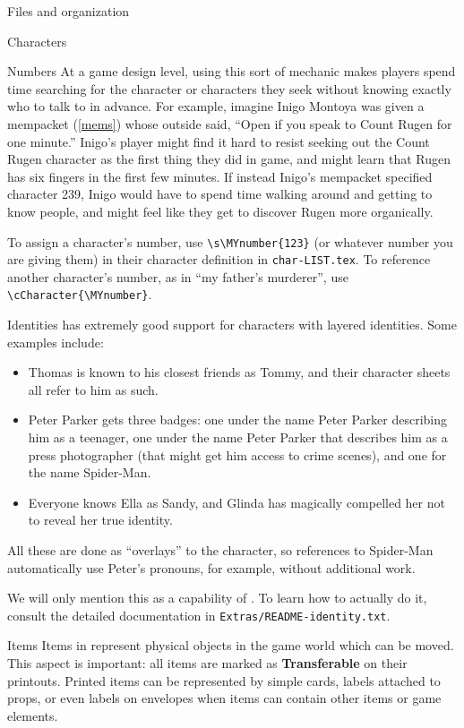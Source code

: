 \documentclass[sheet]{GameTexBase}
\begin{document}
\begin{section}{Files and organization}
\begin{subsection}{Characters}
\begin{subsubsection}{Numbers}
At a game design level, using this sort of mechanic makes players spend time searching for the character or characters they seek without knowing exactly who to talk to in advance.  For example, imagine Inigo Montoya was given a
mempacket (\ref{mems}) whose outside said, ``Open if you speak to Count Rugen for one minute.''  Inigo's player might find it hard to resist seeking out the Count Rugen character as the first thing they did in game, and might learn that Rugen has six fingers in the first few minutes.  If instead Inigo's mempacket specified character 239, Inigo would have to spend time walking around and getting to know people, and might feel like they get to discover Rugen more organically.

To assign a character's number, use \lstinline|\s\MYnumber{123}| (or whatever number you are giving them) in their character definition in \lstinline|char-LIST.tex|.
To reference another character's number, as in ``my father's murderer'', use \lstinline|\cCharacter{\MYnumber}|.
\end{subsubsection}
\begin{subsubsection}{Identities}
\label{identities}
\gametex{} has extremely good support for characters with layered identities.  Some examples include:
\begin{itemize}
\item Thomas is known to his closest friends as Tommy, and their character sheets all refer to him as such.
\item Peter Parker gets three badges: one under the name Peter Parker describing him as a teenager, one under the name Peter Parker that describes him as a press photographer (that might get him access to crime scenes), and one for the name Spider-Man.
\item Everyone knows Ella as Sandy, and Glinda has magically compelled her not to reveal her true identity.
\end{itemize}
All these are done as ``overlays'' to the character, so references to Spider-Man automatically use Peter's pronouns, for example, without additional work.

We will only mention this as a capability of \gametex{}.  To learn how to actually do it, consult the detailed documentation in \lstinline|Extras/README-identity.txt|.
\end{subsubsection}
\end{subsection}
\begin{subsection}{Items}
Items in \gametex{} represent physical objects in the game world which can be moved.  This aspect is important: all items are marked as \textbf{Transferable} on their printouts.
Printed \gametex{} items can be represented by simple cards, labels attached to props, or even labels on envelopes when items can contain other items or game elements.


\end{subsection}
\end{section}
\end{document}
